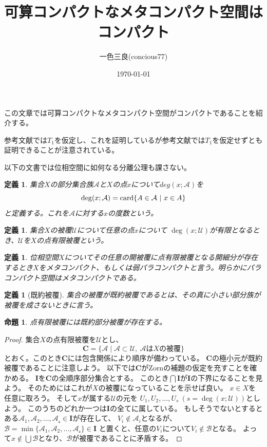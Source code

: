 \documentclass[leqno]{jsarticle}
\title{可算コンパクトなメタコンパクト空間はコンパクト}
\author{一色三良(concious77)}
\date{\today}
\newtheorem{prop}[thm]{命題}
\newtheorem{df}[thm]{定義}
\newcommand{\card}{\text{{\rm card}}}
\begin{document}
\maketitle
この文章では可算コンパクトなメタコンパクト空間がコンパクトであることを紹介する。\par
参考文献\cite{1}では$T_1$を仮定し、これを証明しているが参考文献\cite{2}では$T_1$を仮定せずとも証明できることが注意されている。\par
以下の文書では位相空間に如何なる分離公理も課さない。


\begin{df}
集合$X$の部分集合族$\mathcal{A}$と$X$の点$x$について$deg(x;\mathcal{A})$を
\[
\deg(x;\mathcal{A})=\card\{A\in \mathcal{A}\ |\ x\in A\}
\]
と定義する。これを$\mathcal{A}$に対する$x$の度数という。
\end{df}
\begin{df}
集合$X$の被覆$\mathcal{U}$について任意の点$x$について
$\deg(x;\mathcal{U})$が有限となるとき、$\mathcal{U}$を$X$の点有限被覆という。
\end{df}
\begin{df}
位相空間$X$についてその任意の開被覆に点有限被覆となる開細分が存在するとき$X$をメタコンパクト、もしくは弱パラコンパクトと言う。明らかにパラコンパクト空間はメタコンパクトである。
\end{df}


\begin{df}[既約被覆]
集合の被覆が既約被覆であるとは、その真に小さい部分族が被覆を成さないときに言う。
\end{df}


\begin{prop}
点有限被覆には既約部分被覆が存在する。
\end{prop}
\begin{proof}
集合$X$の点有限被覆を$\mathcal{U}$とし、
\[
\mathbf{C}=\{\mathcal{A}\mid \mathcal{A}\subset \mathcal{U}, \ \text{$\mathcal{A}$は$X$の被覆}\}
\]
とおく。このとき$\mathbf{C}$には包含関係により順序が備わっている。
$\mathbf{C}$の極小元が既約被覆であることに注意しよう。
以下では$\mathbf{C}$がZornの補題の仮定を充すことを確かめる。
$\mathbf{I}$を$\mathbf{C}$の全順序部分集合とする。
このとき$\bigcap\mathbf{I}$が$\mathbf{I}$の下界になることを見よう。
そのためにはこれが$X$の被覆になっていることを示せば良い。
$x\in X$を任意に取ろう。
そして$x$が属する$\mathcal{U}$の元を
$U_1,U_2, \dots, U_s\ (s=\deg(x;\mathcal{U}))$としよう。
このうちのどれか一つは$\mathbf{I}$の全てに属している。
もしそうでないとするとある$\mathcal{A}_1,\mathcal{A}_2,\dots, \mathcal{A_s}\in \mathbf{I}$が存在して、
$V_i\not\in \mathcal{A}_i$となるが、
$\mathcal{B}=\min\{\mathcal{A}_1,\mathcal{A}_2,\dots, \mathcal{A_s}\}\in \mathbf{I}$
と置くと、任意の$V_i$について$V_i\not\in \mathcal{B}$となる。
よって$x\not\in \bigcup\mathcal{B}$となり、$\mathcal{B}$が被覆であることに矛盾する。
\end{proof}
\end{document}

